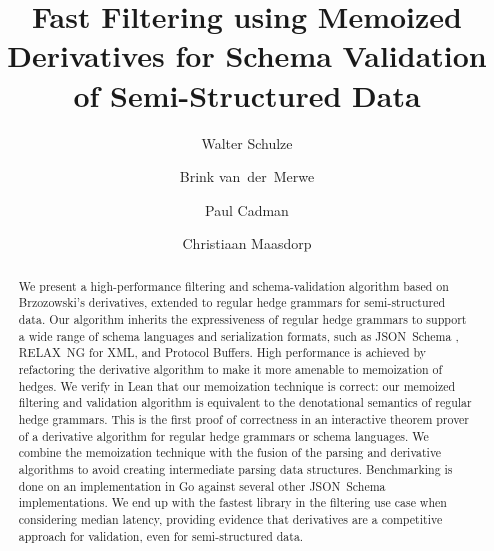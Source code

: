 \documentclass[runningheads]{llncs}
\newif\ifanonymous
\newcommand{\RelaxNG}{%
  RELAX~NG\xspace%
}
\newcommand{\JSONSchema}{%
  JSON~Schema\xspace%
}
\begin{document}
\title{Fast Filtering using Memoized Derivatives for Schema Validation of Semi-Structured Data}

\ifanonymous
  \author{Anonymous Author(s)}
  \authorrunning{Anonymous Author(s)}
  \institute{Anonymous Institution(s)}
\else
  \author{Walter Schulze \and
    Brink van~der~Merwe \and
    Paul Cadman \and
    Christiaan Maasdorp}
\fi

\maketitle

\begin{abstract}
We present a high-performance filtering and schema-validation algorithm based on Brzozowski’s derivatives, extended to regular hedge grammars for semi-structured data.
Our algorithm inherits the expressiveness of regular hedge grammars to support a wide range of schema languages and serialization formats, such as \JSONSchema, \RelaxNG for XML, and Protocol Buffers.
High performance is achieved by refactoring the derivative algorithm to make it more amenable to memoization of hedges.
We verify in Lean that our memoization technique is correct: our memoized filtering and validation algorithm is equivalent to the denotational semantics of regular hedge grammars.
This is the first proof of correctness in an interactive theorem prover of a derivative algorithm for regular hedge grammars or schema languages.
We combine the memoization technique with the fusion of the parsing and derivative algorithms to avoid creating intermediate parsing data structures.
Benchmarking is done on an implementation in Go against several other \JSONSchema implementations.
We end up with the fastest library in the filtering use case when considering median latency, providing evidence that derivatives are a competitive approach for validation, even for semi-structured data.

\end{abstract}
\end{document}
